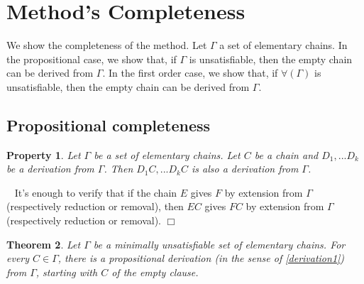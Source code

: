 \documentclass{article}
\newtheorem{theoreme}{Theorem}\newtheorem{lemme}[theoreme]{Lemma}
\newtheorem{propriete}[theoreme]{Property}
\newenvironment{preuve}{\noindent {\em Proof :}\ }{{\hfill
    $\Box$}\vspace{.5pc}} \newcommand{\sg}{\!\!<\!\!}
\begin{document}
\section{Method's Completeness}

We show the completeness of the method. Let $\Gamma$ a set of elementary chains. In the propositional case, we show
that, if $\Gamma$ is unsatisfiable, then the empty chain can be derived from $\Gamma$. In the first order case,
we show that, if $\forall(\Gamma)$ is unsatisfiable, then the empty chain can be derived from $\Gamma$.

\subsection{Propositional completeness}

\begin{propriete}\label{concatenate-property}
Let $\Gamma$ be a set of elementary chains. Let $C$ be a chain and $D_1, ...D_k$ be a derivation from $\Gamma$.
Then $D_1C,...D_kC$ is also a derivation from $\Gamma$.

\end{propriete}

\begin{preuve}
It's enough to verify that if the chain $E$ gives $F$ by extension from $\Gamma$ (respectively reduction or removal), 
then $EC$ gives $FC$ by extension from $\Gamma$ (respectively reduction or removal).
\end{preuve}

\begin{theoreme}\label{completeness-minimal-propositional}
Let $\Gamma$ be a minimally unsatisfiable set of elementary chains. For every $C \in \Gamma$, there is a propositional derivation
(in the sense of \ref{derivation1}) from $\Gamma$, starting with $C$ of the empty clause.
\end{theoreme}
\end{document}
